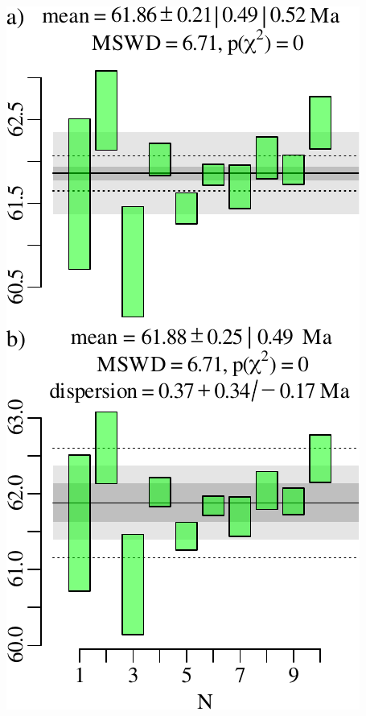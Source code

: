 \begin{refsection}
\noindent\begin{minipage}[t]{.33\linewidth}
\strut\vspace*{-\baselineskip}\newline
\includegraphics[width=\textwidth]{../figures/WtdMeanModel1vsRandomEffects.pdf}

\end{minipage}
\end{refsection}
